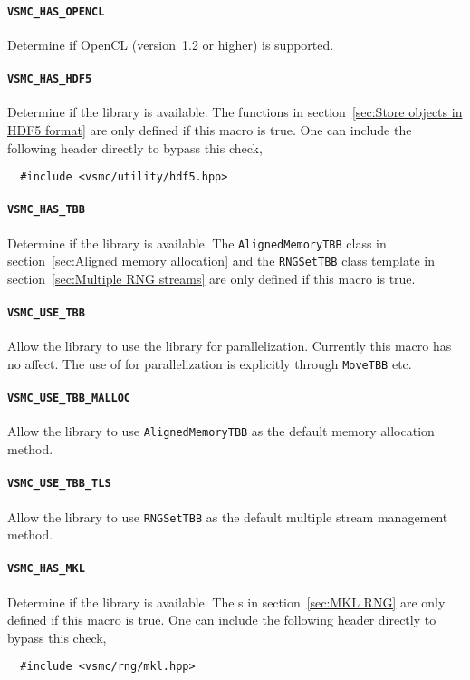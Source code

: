 \paragraph{\texttt{VSMC\_HAS\_OPENCL}} Determine if OpenCL (version~1.2 or
higher) is supported.

\paragraph{\texttt{VSMC\_HAS\_HDF5}} Determine if the \hdf library is
available. The functions in section~\ref{sec:Store objects in HDF5 format} are
only defined if this macro is true. One can include the following header
directly to bypass this check,
\begin{Verbatim}
  #include <vsmc/utility/hdf5.hpp>
\end{Verbatim}

\paragraph{\texttt{VSMC\_HAS\_TBB}} Determine if the \tbb library is available.
The \verb|AlignedMemoryTBB| class in section~\ref{sec:Aligned memory
  allocation} and the \verb|RNGSetTBB| class template in
section~\ref{sec:Multiple RNG streams} are only defined if this macro is true.

\paragraph{\texttt{VSMC\_USE\_TBB}} Allow the library to use the \tbb library
for parallelization. Currently this macro has no affect. The use of \tbb for
parallelization is explicitly through \verb|MoveTBB| etc.

\paragraph{\texttt{VSMC\_USE\_TBB\_MALLOC}} Allow the library to use
\verb|AlignedMemoryTBB| as the default memory allocation method.

\paragraph{\texttt{VSMC\_USE\_TBB\_TLS}} Allow the library to use
\verb|RNGSetTBB| as the default multiple \rng stream management method.

\paragraph{\texttt{VSMC\_HAS\_MKL}} Determine if the \mkl library is available.
The \rng{}s in section~\ref{sec:MKL RNG} are only defined if this macro is
true. One can include the following header directly to bypass this check,
\begin{Verbatim}
  #include <vsmc/rng/mkl.hpp>
\end{Verbatim}

